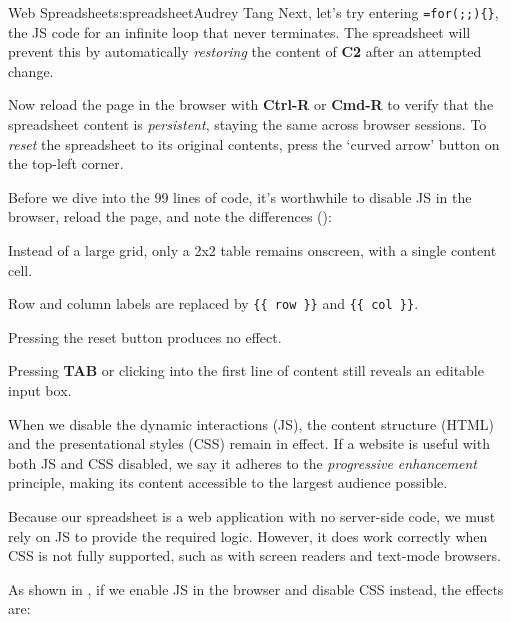 \begin{aosachapter}{Web Spreadsheet}{s:spreadsheet}{Audrey Tang}
Next, let's try entering \texttt{=for(;;)\{\}}, the JS code for an
infinite loop that never terminates. The spreadsheet will prevent this
by automatically \emph{restoring} the content of \textbf{C2} after an
attempted change.

Now reload the page in the browser with \textbf{Ctrl-R} or
\textbf{Cmd-R} to verify that the spreadsheet content is
\emph{persistent}, staying the same across browser sessions. To
\emph{reset} the spreadsheet to its original contents, press the `curved
arrow' button on the top-left corner.

\label{progressive-enhancement}

Before we dive into the 99 lines of code, it's worthwhile to disable JS
in the browser, reload the page, and note the differences
():

\begin{aosaitemize}

\item
  Instead of a large grid, only a 2x2 table remains onscreen, with a
  single content cell.
\item
  Row and column labels are replaced by \texttt{\{\{ row \}\}} and
  \texttt{\{\{ col \}\}}.
\item
  Pressing the reset button produces no effect.
\item
  Pressing \textbf{TAB} or clicking into the first line of content still
  reveals an editable input box.
\end{aosaitemize}


When we disable the dynamic interactions (JS), the content structure
(HTML) and the presentational styles (CSS) remain in effect. If a
website is useful with both JS and CSS disabled, we say it adheres to
the \emph{progressive enhancement} principle, making its content
accessible to the largest audience possible.

Because our spreadsheet is a web application with no server-side code,
we must rely on JS to provide the required logic. However, it does work
correctly when CSS is not fully supported, such as with screen readers
and text-mode browsers.


As shown in , if we enable JS in the
browser and disable CSS instead, the effects are:


\end{aosachapter}
